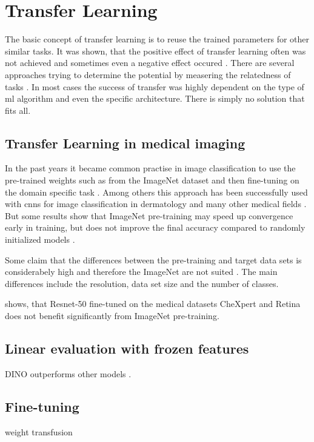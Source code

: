 \section{Transfer Learning}
The basic concept of transfer learning is to reuse the trained parameters for other similar tasks. It was shown, that the positive effect of transfer learning often was not achieved and sometimes even a negative effect occured \autocite{perkins1999}. There are several approaches trying to determine the potential by measering the relatedness of tasks \autocite{torrey2009}. In most cases the success of transfer was highly dependent on the type of \gls{ml} algorithm and even the specific architecture. There is simply no solution that fits all.

\subsection{Transfer Learning in medical imaging}
In the past years it became common practise in image classification to use the pre-trained weights such as from the ImageNet dataset and then fine-tuning on the domain specific task \autocite{russakovsky2014}. 
Among others this approach has been successfully used with \glspl{cnn} for image classification in dermatology and many other medical fields \autocite{esteva2017,lam2018,bayramoglu2016,pardamean2018,yang2018}. But some results show that ImageNet pre-training may speed up convergence early in training, but does not improve the final accuracy compared to randomly initialized models \autocite{he2018}.

Some claim that the differences between the pre-training and target data sets is considerabely high and therefore the ImageNet are not suited \autocite{raghu2019}.
The main differences include the resolution, data set size and the number of classes.

\autocite{raghu2019} shows, that Resnet-50 fine-tuned on the medical datasets CheXpert and Retina does not benefit significantly from ImageNet pre-training.


\subsection{Linear evaluation with frozen features}
DINO outperforms other models \autocite{truong2021}.

\subsection{Fine-tuning}
weight transfusion


